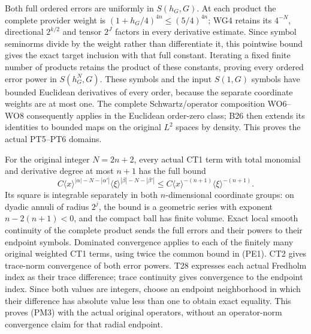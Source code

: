 \documentclass[
  11pt,
]{article}
\begin{document}
Both full ordered errors are uniformly in \(S(h_G,G)\). At each product
the complete provider weight is \((1+h_G/4)^{4n}\le(5/4)^{4n}\); WG4
retains its \(4^{-N}\), directional \(2^{k/2}\) and tensor \(2^J\)
factors in every derivative estimate. Since symbol seminorms divide by
the weight rather than differentiate it, this pointwise bound gives the
exact target inclusion with that full constant. Iterating a fixed finite
number of products retains the product of these constants, proving every
ordered error power in \(S(h_G^N,G)\). These symbols and the input
\(S(1,G)\) symbols have bounded Euclidean derivatives of every order,
because the separate coordinate weights are at most one. The complete
Schwartz/operator composition WO6--WO8 consequently applies in the
Euclidean order-zero class; B26 then extends its identities to bounded
maps on the original \(L^2\) spaces by density. This proves the actual
PT5--PT6 domains.

For the original integer \(N=2n+2\), every actual CT1 term with total
monomial and derivative degree at most \(n+1\) has the full bound \[
 C\langle x\rangle^{|\alpha|-N-|\alpha'|}
       \langle\xi\rangle^{|\beta|-N-|\beta'|}
 \le C\langle x\rangle^{-(n+1)}
       \langle\xi\rangle^{-(n+1)}.
 \tag{PE1}
\] Its square is integrable separately in both \(n\)-dimensional
coordinate groups: on dyadic annuli of radius \(2^j\), the bound is a
geometric series with exponent \(n-2(n+1)<0\), and the compact ball has
finite volume. Exact local smooth continuity of the complete product
sends the full errors and their powers to their endpoint symbols.
Dominated convergence applies to each of the finitely many original
weighted CT1 terms, using twice the common bound in (PE1). CT2 gives
trace-norm convergence of both error powers. T28 expresses each actual
Fredholm index as their trace difference; trace continuity gives
convergence to the endpoint index. Since both values are integers,
choose an endpoint neighborhood in which their difference has absolute
value less than one to obtain exact equality. This proves (PM3) with the
actual original operators, without an operator-norm convergence claim
for that radial endpoint.
\end{document}
